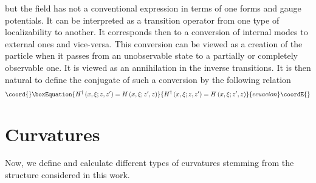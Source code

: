 \documentclass[12pt,a4paper]{article}
\begin{document}
but the \coordHE{} field has not a conventional
expression in terms of one forms and gauge potentials. It can be interpreted
as a transition operator from one type of localizability to another. It
corresponds then to a conversion of internal modes to external ones and
vice-versa. This conversion can be viewed as a creation of the particle when
it passes from an unobservable state to a partially or completely observable
one. It is viewed as an annihilation in the inverse transitions. It is then
natural to define the conjugate of such a conversion by the following
relation
\begin{equation}\coord{}\boxEquation{
H^{\dagger}\left(  x,\xi;z,z^{\prime}\right)  =H\left(  x,\xi;z^{\prime
},z\right)
}{
H^{\dagger}\left(  x,\xi;z,z^{\prime}\right)  =H\left(  x,\xi;z^{\prime
},z\right)
}{ecuacion}\coordE{}\end{equation}

\section{Curvatures}

Now, we define and calculate different types of curvatures stemming from the
structure considered in this work.
\end{document}
